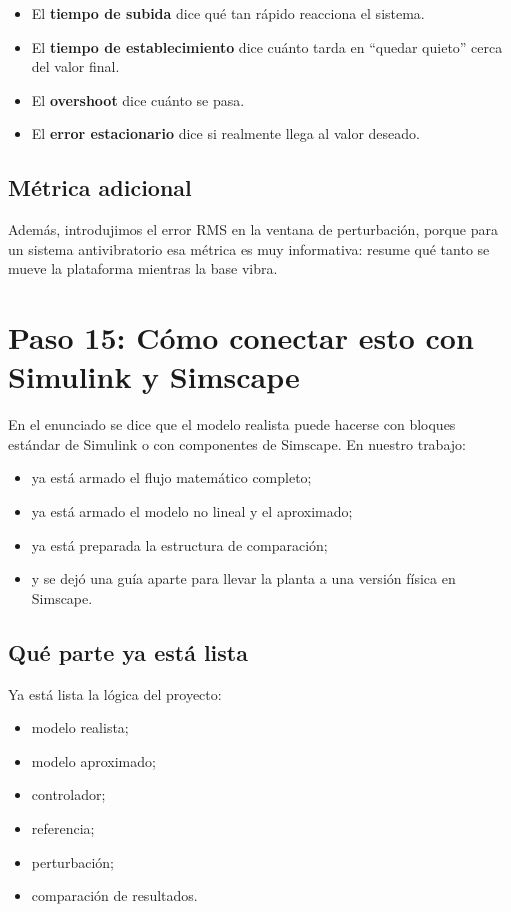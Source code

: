 \documentclass[11pt]{article}
\begin{document}
\begin{itemize}[leftmargin=1.2cm]
\item El \textbf{tiempo de subida} dice qu\'e tan r\'apido reacciona el sistema.
\item El \textbf{tiempo de establecimiento} dice cu\'anto tarda en ``quedar quieto'' cerca del valor final.
\item El \textbf{overshoot} dice cu\'anto se pasa.
\item El \textbf{error estacionario} dice si realmente llega al valor deseado.
\end{itemize}

\subsection{M\'etrica adicional}

Adem\'as, introdujimos el error RMS en la ventana de perturbaci\'on, porque para un sistema antivibratorio esa m\'etrica es muy informativa: resume qu\'e tanto se mueve la plataforma mientras la base vibra.

\section{Paso 15: C\'omo conectar esto con Simulink y Simscape}

En el enunciado se dice que el modelo realista puede hacerse con bloques est\'andar de Simulink o con componentes de Simscape. En nuestro trabajo:

\begin{itemize}[leftmargin=1.2cm]
\item ya est\'a armado el flujo matem\'atico completo;
\item ya est\'a armado el modelo no lineal y el aproximado;
\item ya est\'a preparada la estructura de comparaci\'on;
\item y se dej\'o una gu\'ia aparte para llevar la planta a una versi\'on f\'isica en Simscape.
\end{itemize}

\subsection{Qu\'e parte ya est\'a lista}

Ya est\'a lista la l\'ogica del proyecto:

\begin{itemize}[leftmargin=1.2cm]
\item modelo realista;
\item modelo aproximado;
\item controlador;
\item referencia;
\item perturbaci\'on;
\item comparaci\'on de resultados.
\end{itemize}
\end{document}
